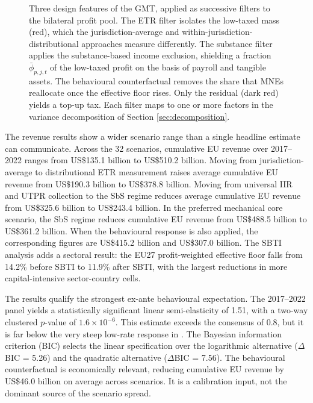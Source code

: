 \documentclass[11pt,a4paper]{article}
\begin{document}
\begin{figure}[H]
{
}
\caption[GMT design features as successive filters.]{Three design features of the GMT, applied as successive filters to the bilateral profit pool. The ETR filter isolates the low-taxed mass (red), which the jurisdiction-average and within-jurisdiction-distributional approaches measure differently. The substance filter applies the substance-based income exclusion, shielding a fraction $\bar{\phi}_{p,j,t}$ of the low-taxed profit on the basis of payroll and tangible assets. The behavioural counterfactual removes the share that MNEs reallocate once the effective floor rises. Only the residual (dark red) yields a top-up tax. Each filter maps to one or more factors in the variance decomposition of Section \ref{sec:decomposition}.}
\label{fig:gmt_mechanics_intro}
\end{figure}

The revenue results show a wider scenario range than a single headline estimate can communicate. Across the 32 scenarios, cumulative EU revenue over 2017--2022 ranges from US\$135.1 billion to US\$510.2 billion. Moving from jurisdiction-average to distributional ETR measurement raises average cumulative EU revenue from US\$190.3 billion to US\$378.8 billion. Moving from universal IIR and UTPR collection to the SbS regime reduces average cumulative EU revenue from US\$325.6 billion to US\$243.4 billion. In the preferred mechanical core scenario, the SbS regime reduces cumulative EU revenue from US\$488.5 billion to US\$361.2 billion. When the behavioural response is also applied, the corresponding figures are US\$415.2 billion and US\$307.0 billion. The SBTI analysis adds a sectoral result: the EU27 profit-weighted effective floor falls from 14.2\% before SBTI to 11.9\% after SBTI, with the largest reductions in more capital-intensive sector-country cells.

The results qualify the strongest ex-ante behavioural expectation. The 2017--2022 panel yields a statistically significant linear semi-elasticity of 1.51, with a two-way clustered $p$-value of $1.6 \times 10^{-6}$. This estimate exceeds the \citet{heckemeyer2017} consensus of 0.8, but it is far below the very steep low-rate response in \citet{dowd2017}. The Bayesian information criterion (BIC) selects the linear specification over the logarithmic alternative ($\Delta$BIC = 5.26) and the quadratic alternative ($\Delta$BIC = 7.56). The behavioural counterfactual is economically relevant, reducing cumulative EU revenue by US\$46.0 billion on average across scenarios. It is a calibration input, not the dominant source of the scenario spread.
\end{document}
